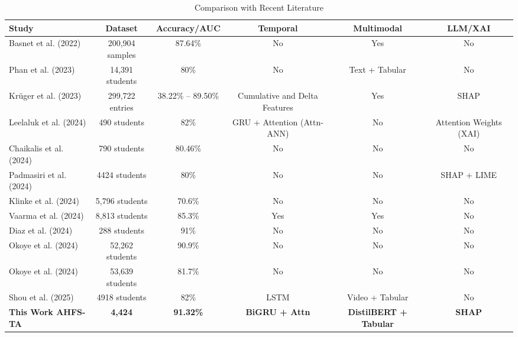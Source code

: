 \documentclass[journal]{IEEEtran}
\begin{document}
\begin{table}[t]
\centering
\caption{Comparison with Recent Literature}
\label{tab:literature_gap}
\begin{tabular}{lccccc}
\toprule
\textbf{Study} & \textbf{Dataset} & \textbf{Accuracy/AUC} & \textbf{Temporal} & \textbf{Multimodal} & \textbf{LLM/XAI} \\
\midrule
Basnet et al. (2022) \cite{basnet2022dropout} & 200,904 samples & 87.64\% & No & Yes & No \\
Phan et al. (2023) \cite{phan2023decision} & 14,391 students & 80\% & No & Text + Tabular & No \\
Krüger et al. (2023) \cite{kruger2023explainable} & 299,722 entries & 38.22\% – 89.50\% & Cumulative and Delta Features & Yes & SHAP \\
Leelaluk et al. (2024) \cite{leelaluk2024attention} & 490 students & 82\% &  GRU + Attention (Attn-ANN) & No & Attention Weights (XAI) \\
Chaikalis et al. (2024) \cite{chaikalis2024predictive} & 790 students & 80.46\% & No & No & No \\
Padmasiri et al. (2024) \cite{padmasiri2024interpretable} & 4424 students & 80\% & No & No & SHAP + LIME \\
Klinke et al. (2024) \cite{klinke2024equal} & 5,796 students & 70.6\% & No & No & No \\
Vaarma et al. (2024) \cite{vaarma2024predicting} & 8,813 students & 85.3\% & Yes & Yes & No \\
Diaz et al. (2024) \cite{diaz2024toward} & 288 students & 91\% & No & No & No \\
Okoye et al. (2024) \cite{okoye2024machine} & 52,262 students & 90.9\% & No & No & No \\
Okoye et al. (2024) \cite{okoye2024machine} & 53,639 students & 81.7\% & No & No & No \\
Shou et al. (2025) \cite{shou2025classroom} & 4918 students & 82\% & LSTM & Video + Tabular & No \\
\midrule
\textbf{This Work AHFS-TA} & \textbf{4,424} & \textbf{91.32\%} & \textbf{BiGRU + Attn} & \textbf{DistilBERT + Tabular} & \textbf{SHAP} \\
\bottomrule
\end{tabular}
\end{table}
\end{document}
